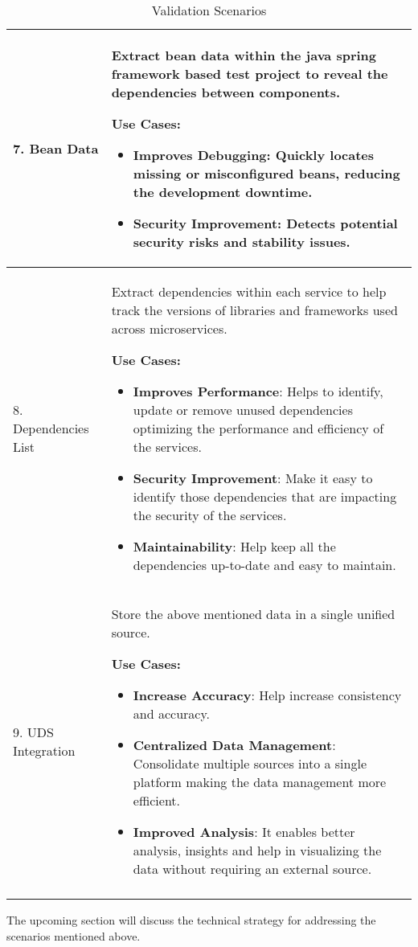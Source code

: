 \begin{longtable}{|m{4cm}|m{10cm}|}
7. Bean Data & Extract bean data within the java spring framework based test project to reveal the dependencies between components.

\textbf{Use Cases:}
\begin{itemize}
	\item \textbf{Improves Debugging}: Quickly locates missing or misconfigured beans, reducing the development downtime.
	\item \textbf{Security Improvement}: Detects potential security risks and stability issues.
\end{itemize}
\\ \hline

8. Dependencies List & Extract dependencies within each service to help track the versions of libraries and frameworks used across microservices.

\textbf{Use Cases:}
\begin{itemize}
	\item \textbf{Improves Performance}: Helps to identify, update or remove unused dependencies optimizing the performance and efficiency of the services.
	\item \textbf{Security Improvement}: Make it easy to identify those dependencies that are impacting the security of the services.
	\item \textbf{Maintainability}: Help keep all the dependencies up-to-date and easy to maintain.
\end{itemize}
\\ \hline

9. UDS Integration & Store the above mentioned data in a single unified source.

\textbf{Use Cases:}
\begin{itemize}
	\item \textbf{Increase Accuracy}:  Help increase consistency and accuracy.
	\item \textbf{Centralized Data Management}: Consolidate multiple sources into a single platform making the data management more efficient.
	\item \textbf{Improved Analysis}: It enables better analysis, insights and help in visualizing the data without requiring an external source.
\end{itemize}
\\ \hline

\caption{Validation Scenarios}	
\label{table_vision_scenarios}
\end{longtable}

The upcoming section will discuss the technical strategy for addressing the scenarios mentioned above.